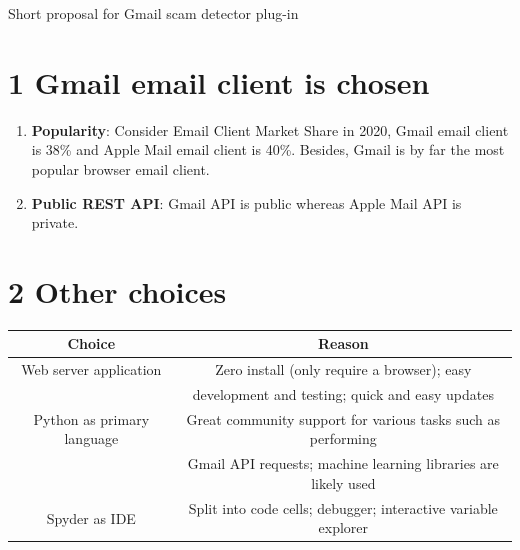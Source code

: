\documentclass[11pt]{article}
\begin{document}






\begin{center}
\huge{Short proposal for Gmail scam detector plug-in}
\end{center}

\section*{\large{1 \hspace{10pt} Gmail email client is chosen}}
\begin{enumerate}
\item \textbf{Popularity}: Consider Email Client Market Share in 2020, Gmail email client is 38\% and Apple Mail email client is 40\%. Besides, Gmail is by far the most popular browser email client.
\item \textbf{Public REST API}: Gmail API is public whereas Apple Mail API is private.
\end{enumerate}

\section*{\large{2 \hspace{10pt} Other choices}}

\begin{spacing}{1}

\begin{center}
 \begin{tabular}{|c | c|} 
 \hline
 Choice & Reason \\
 \hline
 Web server application & Zero install (only require a browser); easy \\ 
  & development and testing; quick and easy updates \\
 \hline
 Python as primary language & Great community support for various tasks such as performing \\
  & Gmail API requests; machine learning libraries are likely used \\
 \hline
 Spyder as IDE & Split into code cells; debugger; interactive variable explorer \\
 \hline
\end{tabular}
\end{center}

\end{spacing}
\end{document}
